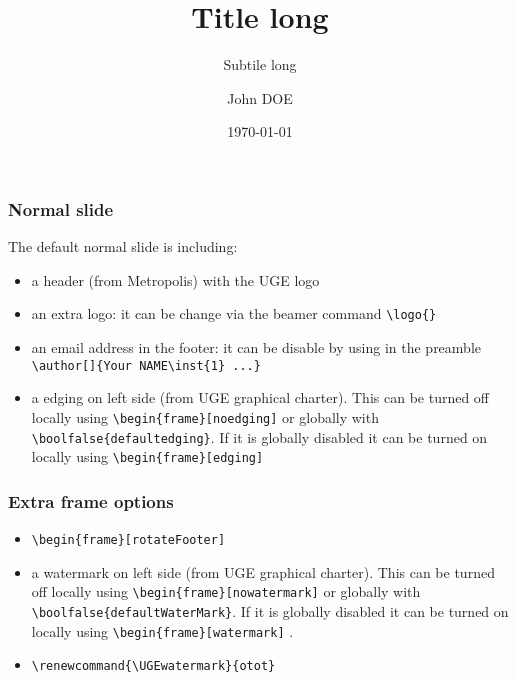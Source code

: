 \documentclass[notheorems, noamsthm, aspectratio=169, 10pt]{beamer}
\title[shorttitle]{Title long}
\subtitle[shortsubtitle]{Subtile long}
\date[shortdate]{\today}
\author[john.doe@mail.com]{John DOE\inst{1}}
\institute[shortinstitute]{\inst{1} An Awesome Company}
\begin{document}

\begin{frame}
   \frametitle{Normal slide}

   The default normal slide is including:
   \begin{itemize}
      \item a header (from Metropolis) with the UGE logo
      \item an extra logo: it can be change via the beamer command \verb|\logo{}|
      \item an email address in the footer: it can be disable by using in the preamble 
         \verb|\author[]{Your NAME\inst{1} ...}|
      \item a edging on left side (from UGE graphical charter). This can be turned off locally using \verb|\begin{frame}[noedging]| or globally with \verb|\boolfalse{defaultedging}|. If it is globally disabled it can be turned on locally using \verb|\begin{frame}[edging]|
   \end{itemize}
\end{frame}


\begin{frame}
   \frametitle{Extra frame options}

   \begin{itemize}
      \item \verb|\begin{frame}[rotateFooter]|
      \item a watermark on left side (from UGE graphical charter). This can be turned off locally using \verb|\begin{frame}[nowatermark]| or globally with \verb|\boolfalse{defaultWaterMark}|. If it is globally disabled it can be turned on locally using \verb|\begin{frame}[watermark]| .
      \item \verb|\renewcommand{\UGEwatermark}{otot}|
   \end{itemize}
\end{frame}
\end{document}

